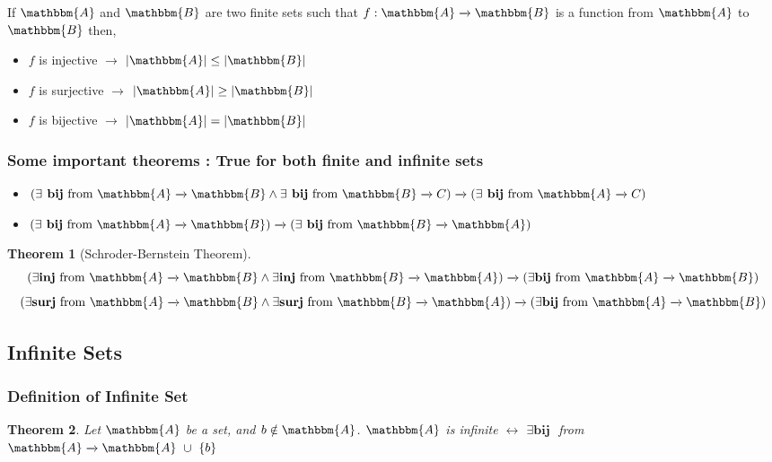 \documentclass[14pt]{extarticle}
\newcommand{\impl}{\xrightarrow{}}
\newcommand{\ifff}{\longleftrightarrow}
\newcommand{\A}{\mathbbm{A}}
\newcommand{\B}{\mathbbm{B}}
\newtheorem{theorem}{Theorem}
\begin{document}
If $\A$ and $\B$ are two finite sets such that $f : \A \impl \B$ is a function from $\A$ to $\B$ then,

\begin{itemize}
    \item $f$ is injective $\impl$ $|\A| \leq |\B|$
    \item $f$ is surjective $\impl$ $|\A| \geq |\B|$
    \item $f$ is bijective $\impl$ $|\A| = |\B|$
\end{itemize}

\newpage

\subsubsection{Some important theorems : True for both finite and infinite sets}

\begin{itemize}
    \item $(\exists\textbf{ bij} \text{ from } \A \impl \B \land \exists\textbf{ bij} \text{ from } \B \impl C) \impl (\exists\textbf{ bij} \text{ from } \A \impl C)$

    \item $(\exists\textbf{ bij} \text{ from } \A \impl \B) \impl (\exists\textbf{ bij} \text{ from } \B \impl \A)$

\end{itemize}

\begin{theorem} [Schroder-Bernstein Theorem]
        \[(\exists \textbf{inj} \text{ from } \A \impl \B \land \exists \textbf{inj} \text{ from } \B \impl \A) \impl (\exists \textbf{bij} \text{ from } \A \impl \B)\]
        \[(\exists \textbf{surj} \text{ from } \A \impl \B \land \exists \textbf{surj} \text{ from } \B \impl \A) \impl (\exists \textbf{bij} \text{ from } \A \impl \B)\]
\end{theorem}

\subsection{Infinite Sets}

\subsubsection{Definition of Infinite Set}

\begin{theorem}
    Let $\A$ be a set, and $b \notin \A$. $\A$ is infinite $\ifff$ $\exists \textbf{bij }$ from $\A \impl \A \ \cup \ \{b\} $ 
\end{theorem}
\end{document}
